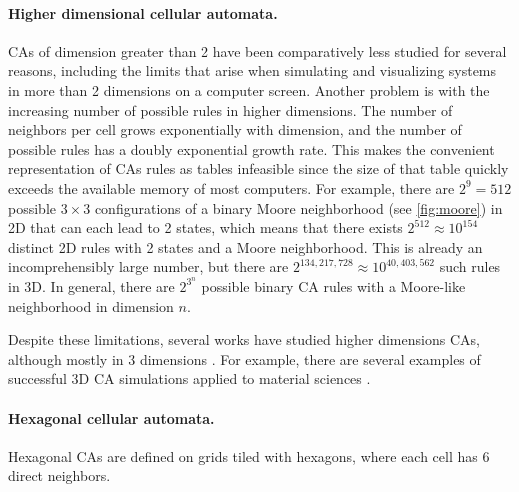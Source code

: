 \paragraph{Higher dimensional cellular automata.}
\acp{CA} of dimension greater than 2 have been comparatively less studied for
several reasons, including the limits that arise when simulating and visualizing
systems in more than 2 dimensions on a computer screen. Another problem is with
the increasing number of possible rules in higher dimensions. The number of
neighbors per cell grows exponentially with dimension, and the number of
possible rules has a doubly exponential growth rate. This makes the
convenient representation of \acp{CA} rules as tables infeasible since the size
of that table quickly exceeds the available memory of most computers. For
example, there are $2^9 = 512$ possible $3\times 3$ configurations of a binary Moore neighborhood (see \ref{fig:moore}) in 2D that can each lead to 2 states, which means that there exists $2^{512} \approx 10^{154}$ distinct 2D rules with 2 states and a
Moore neighborhood. This is already an incomprehensibly large number, but there
are $2^{134,217,728} \approx 10^{40,403,562}$ such rules in 3D. In general, there are $2^{3^n}$ possible binary \ac{CA} rules with a Moore-like neighborhood in dimension $n$.

Despite these limitations, several works have studied higher dimensions \acp{CA},
although mostly in 3 dimensions
\parencite{tsalidesThreedimensionalCellularAutomata1989,
  sudhakaranGrowing3DArtefacts2021}. For example, there are several examples of
successful 3D \ac{CA} simulations applied to material sciences
\parencite{gandin3DCellularAutomaton1997, arataFreeformShapeModeling1999,
  panStudyFailureScale2009, dicaprio3DCellularAutomata2016}.

\paragraph{Hexagonal cellular automata.}
Hexagonal \acp{CA} are defined on grids tiled with hexagons, where each
cell has 6 direct neighbors.

